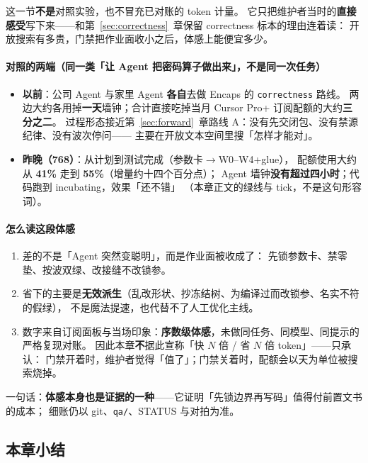 \documentclass[UTF8,a4paper,11pt]{ctexart}
\theoremstyle{definition}
\theoremstyle{plain}
\theoremstyle{remark}
\numberwithin{figure}{section}
\numberwithin{table}{section}
\begin{document}
这一节\textbf{不是}对照实验，也不冒充已对账的 token 计量。
它只把维护者当时的\textbf{直接感受}写下来——和第~\ref{sec:correctness}~章保留 correctness 标本的理由连着读：
开放搜索有多贵，门禁把作业面收小之后，体感上能便宜多少。

\paragraph{对照的两端（同一类「让 Agent 把密码算子做出来」，不是同一次任务）}
\begin{itemize}
  \item \textbf{以前}：公司 Agent 与家里 Agent \textbf{各自}去做 Encaps 的 \texttt{correctness} 路线。
        两边大约各用掉\textbf{一天}墙钟；合计直接吃掉当月 Cursor Pro+ 订阅配额的大约\textbf{三分之二}。
        过程形态接近第~\ref{sec:forward}~章路线 A：没有先交闭包、没有禁源纪律、没有波次停问——
        主要在开放文本空间里搜「怎样才能对」。
  \item \textbf{昨晚（768）}：从计划到测试完成（参数卡$\to$W0--W4+glue），
        配额使用大约从 \textbf{41\%} 走到 \textbf{55\%}（增量约十四个百分点）；
        Agent 墙钟\textbf{没有超过四小时}；代码跑到 incubating，效果「还不错」
        （本章正文的绿线与 tick，不是这句形容词）。
\end{itemize}

\paragraph{怎么读这段体感}
\begin{enumerate}
  \item 差的不是「Agent 突然变聪明」，而是作业面被收成了：
        先锁参数卡、禁零垫、按波双绿、改接缝不改锁参。
  \item 省下的主要是\textbf{无效派生}（乱改形状、抄冻结树、为编译过而改锁参、名实不符的假绿），
        不是魔法提速，也代替不了人工优化主线。
  \item 数字来自订阅面板与当场印象：\textbf{序数级体感}，未做同任务、同模型、同提示的严格复现对账。
        因此本章\textbf{不}据此宣称「快 $N$ 倍 / 省 $N$ 倍 token」——只承认：
        门禁开着时，维护者觉得「值了」；门禁关着时，配额会以天为单位被搜索烧掉。
\end{enumerate}

一句话：\textbf{体感本身也是证据的一种}——它证明「先锁边界再写码」值得付前置文书的成本；
细账仍以 git、\texttt{qa/}、STATUS 与对拍为准。

\subsection{本章小结}
\label{sec:mlkem768-summary}
\end{document}
